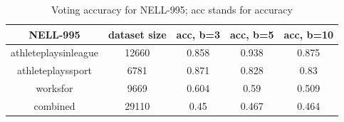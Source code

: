 \begin{table}[h!]
\centering
\caption{Hits@k for NELL-995; acc stands for accuracy}
\label{Tbl:searchnl}
\end{table}

\begin{table}[h!]
\centering
\caption{Voting accuracy for NELL-995; acc stands for accuracy}
\label{Tbl:votingnl}
\resizebox{\columnwidth}{!}
{\begin{tabular}{|c|c|c|c|c|}
\hline
NELL-995     & dataset size & acc, b=3 & acc, b=5 & acc, b=10 \\ \hline
athleteplaysinleague & 12660              & 0.858         & 0.938                                 & 0.875                                  \\ \hline
athleteplayssport    & 6781               & 0.871         & 0.828                                 & 0.83                                   \\ \hline
worksfor             & 9669               & 0.604         & 0.59                                  & 0.509                                  \\ \hline
combined             & 29110              & 0.45          & 0.467         & 0.464          \\ \hline
\end{tabular}}
\end{table}




